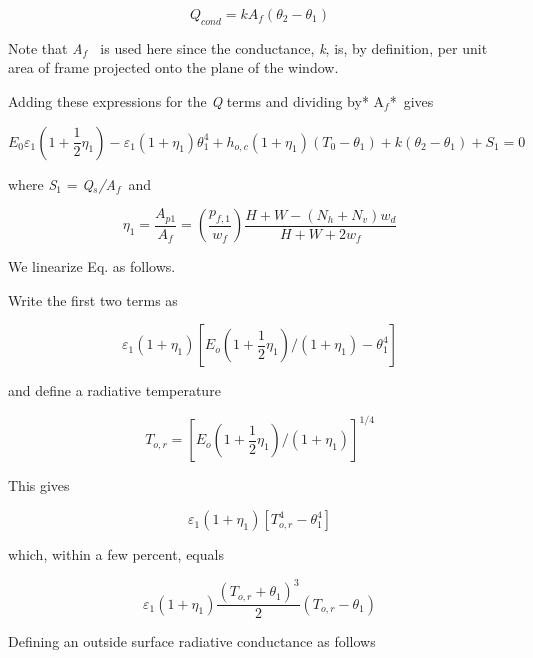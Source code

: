 \begin{equation}
{Q_{cond}} = k{A_f}({\theta_2} - {\theta_1})
\end{equation}

Note that \emph{A\(_{f}\) ~}is used here since the conductance, \emph{k}, is, by definition, per unit area of frame projected onto the plane of the window.

Adding these expressions for the \emph{Q} terms and dividing by* A\(_{f}\)*~gives

\begin{equation}
{E_0}{\varepsilon_1}\left( {1 + \frac{1}{2}{\eta_1}} \right) - {\varepsilon_1}\left( {1 + {\eta_1}} \right)\theta_1^4 + {h_{o,c}}\left( {1 + {\eta_1}} \right)\left( {{T_0} - {\theta_1}} \right) + k\left( {{\theta_2} - {\theta_1}} \right) + {S_1} = 0
\end{equation}

where \emph{S\(_{1}\)} = \emph{Q\(_{s}\)/A\(_{f}\)}~and

\begin{equation}
{\eta_1} = \frac{{{A_{p1}}}}{{{A_f}}} = \left( {\frac{{{p_{f,1}}}}{{{w_f}}}} \right)\frac{{H + W - ({N_h} + {N_v}){w_d}}}{{H + W + 2{w_f}}}
\end{equation}

We linearize Eq. as follows.

Write the first two terms as

\begin{equation}
{\varepsilon_1}(1 + {\eta_1})[{E_o}(1 + \frac{1}{2}{\eta_1})/(1 + {\eta_1}) - \theta_1^4]
\end{equation}

and define a radiative temperature

\begin{equation}
{T_{o,r}} = {[{E_o}(1 + \frac{1}{2}{\eta_1})/(1 + {\eta_1})]^{1/4}}
\end{equation}

This gives

\begin{equation}
{\varepsilon_1}(1 + {\eta_1})[T_{o,r}^4 - \theta_1^4]
\end{equation}

which, within a few percent, equals

\begin{equation}
{\varepsilon_1}(1 + {\eta_1})\frac{{{{({T_{o,r}} + {\theta_1})}^3}}}{2}({T_{o,r}} - {\theta_1})
\end{equation}

Defining an outside surface radiative conductance as follows

